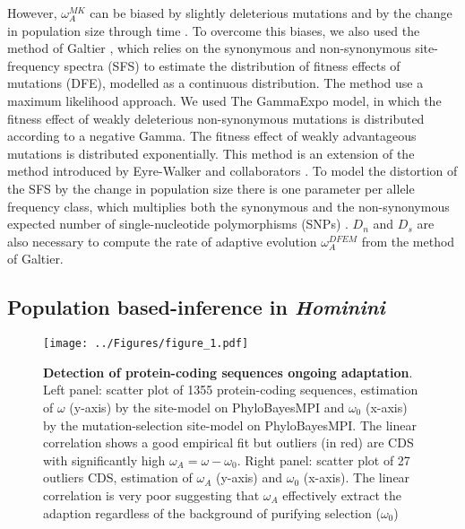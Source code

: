 \documentclass[10pt]{article}
\begin{document}
\begin{multicols}{2}
	However, $\omega_A^{MK}$ can be biased by slightly deleterious mutations \cite{eyre-walker_quantifying_2002} and by the change in population size through time \cite{eyre-walker_changing_2002}. To overcome this biases, we also used the method of Galtier \cite{galtier_adaptive_2016}, which relies on the synonymous and non-synonymous site-frequency spectra (SFS) to estimate the distribution of fitness effects of mutations (DFE), modelled as a continuous distribution. The method use a maximum likelihood approach. We used The GammaExpo model, in which the fitness effect of weakly deleterious non-synonymous mutations is distributed according to a negative Gamma. The fitness effect of weakly advantageous mutations is distributed exponentially.  This method is an extension of the method introduced by Eyre-Walker and collaborators \cite{eyre-walker_estimating_2009}. To model the distortion of the SFS by the change in population size there is one parameter per allele frequency class, which multiplies both the synonymous and the non-synonymous expected number of single-nucleotide polymorphisms (SNPs) \cite{eyre-walker_distribution_2006}. $D_n$ and $D_s$ are also necessary to compute the rate of adaptive evolution $\omega_A^{DFEM}$ from the method of Galtier.
	
	\subsection*{Population based-inference in \textit{Hominini}}
		\begin{figure*}[hb!]
	\begin{mdframed}
		\centering
		\texttt{[image: ../Figures/figure\_1.pdf]}\\
		\caption{ \textbf{Detection of protein-coding sequences ongoing adaptation}. Left panel: scatter plot of 1355 protein-coding sequences, estimation of $\omega$ (y-axis) by the site-model on PhyloBayesMPI and $\omega_{0}$ (x-axis) by the mutation-selection site-model on PhyloBayesMPI. The linear correlation shows a good empirical fit but outliers (in red) are CDS with significantly high $\omega_A = \omega - \omega_{0}$. Right panel: scatter plot of 27 outliers CDS, estimation of $\omega_A$ (y-axis) and $\omega_{0}$ (x-axis). The linear correlation is very poor suggesting that $\omega_A$ effectively extract the adaption regardless of the background of purifying selection ($\omega_0$)  \label{fig:omega_pb}}
	\end{mdframed}
\end{figure*}


\end{multicols}
\end{document}
